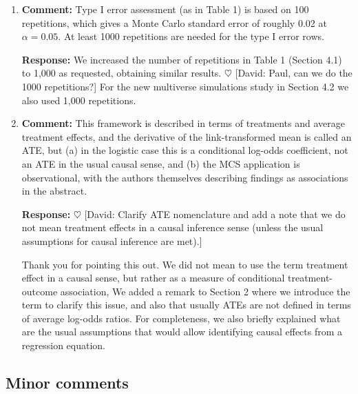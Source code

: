 \documentclass[11pt, a4paper]{article}
\newcommand{\reply}{\vspace{0.3cm} \noindent \textbf{Response:} {\it }}
\newcommand{\david}[1]{{\small{\color{blue} \sf $\heartsuit$ [David: #1]}}}
\begin{document}
\begin{enumerate}[leftmargin=*]
    \vspace{0.5cm}

    \item \textbf{Comment:} Type I error assessment (as in Table 1) is based on 100 repetitions, which gives a Monte Carlo standard error of roughly 0.02 at $\alpha = 0.05$. At least 1000 repetitions are needed for the type I error rows.
    
    \reply We increased the number of repetitions in Table 1 (Section 4.1) to 1,000 as requested, obtaining similar results. \david{Paul, can we do the 1000 repetitions?}
For the new multiverse simulations study in Section 4.2 we also used 1,000 repetitions.

    \vspace{0.5cm}

    \item \textbf{Comment:} This framework is described in terms of treatments and average treatment effects, and the derivative of the link-transformed mean is called an ATE, but (a) in the logistic case this is a conditional log-odds coefficient, not an ATE in the usual causal sense, and (b) the MCS application is observational, with the authors themselves describing findings as associations in the abstract.
    
    \reply \david{Clarify ATE nomenclature and add a note that we do not mean treatment effects in a causal inference sense (unless the usual assumptions for causal inference are met).}

Thank you for pointing this out. We did not mean to use the term treatment effect in a causal sense, but rather as a measure of conditional treatment-outcome association,
We added a remark to Section 2 where we introduce the term to clarify this issue, and also that usually ATEs are not defined in terms of average log-odds ratios.
For completeness, we also briefly explained what are the usual assumptions that would allow identifying causal effects from a regression equation.

\end{enumerate}


\subsection*{Minor comments}
\end{document}
